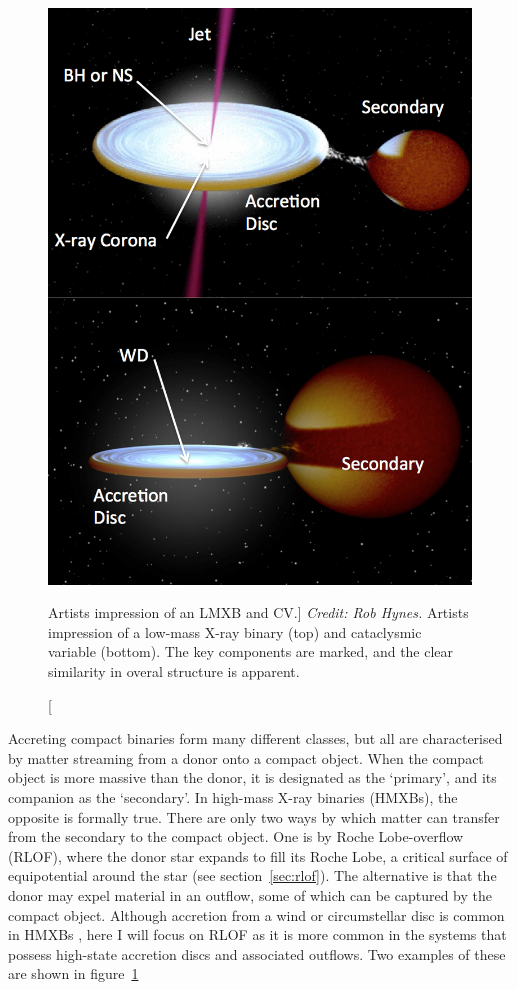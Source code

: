 \begin{figure}
\centering
\includegraphics[width=1.0\textwidth]{figures/01-intro/cv_and_xrb.png}
\caption
[Artists impression of an LMXB and CV.]
{
{\sl Credit: Rob Hynes.} 
Artists impression of a low-mass X-ray binary (top) and
cataclysmic variable (bottom). The key components are marked,
and the clear similarity in overal structure is apparent.
} 
\label{fig:cv_and_xrb}
\end{figure}

Accreting compact binaries form many different classes, 
but all are characterised by matter streaming from a donor
onto a compact object. When the compact object is more massive 
than the donor, it is designated as the `primary', 
and its companion as the `secondary'. 
In high-mass X-ray binaries (HMXBs), the opposite is formally true.
There are only two ways by which matter can transfer 
from the secondary to the compact object. One is by Roche Lobe-overflow (RLOF),
where the donor star expands to fill its Roche Lobe, a critical surface
of equipotential around the star (see section~\ref{sec:rlof}). 
The alternative is that the donor may expel
material in an outflow, some of which can be captured by the compact object. 
Although accretion from a wind or circumstellar disc is common in 
HMXBs \citep{bartlett2013}, here I will focus on 
RLOF as it is more common in the systems that possess high-state accretion discs
and associated outflows. Two examples of these are shown in figure~\ref{fig:cv_and_xrb}


